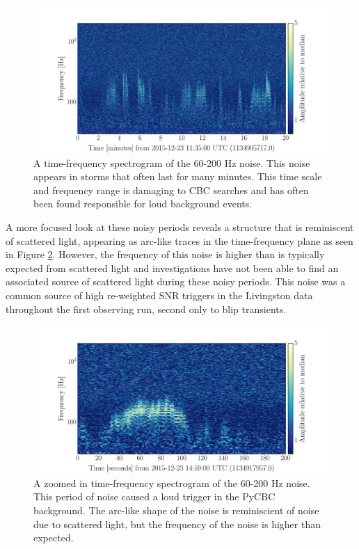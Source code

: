 \begin{figure}[!ht]%
\centering
  \includegraphics[width=\textwidth]{figures/o1-cbc-dq-paper/60-200Hz-noise-spectrogram}
  \caption[Time-frequency plot of 60-200 Hz noise]{A time-frequency spectrogram of the 60-200 Hz noise. This noise appears in storms %
           that often last for many minutes. This time scale and frequency range is damaging %
           to CBC searches and has often been found responsible for loud background events.}
\label{fig:60-200-Hz-noise}
\end{figure}

A more focused look at these noisy periods
reveals a structure that is reminiscent of scattered light, appearing as arc-like
traces in the time-frequency plane as seen in Figure \ref{fig:zoom-60-200-Hz-noise}. However, the frequency
of this noise is higher than is typically expected from scattered light and investigations have not
been able to find an associated source of scattered light during these noisy periods.
This noise was a common source of high re-weighted SNR triggers in the Livingston
data throughout the first observing run, second only to blip transients.

\begin{figure}[!ht]%
\centering
  \includegraphics[width=\textwidth]{figures/o1-cbc-dq-paper/zoom-60-200-Hz-spectrogram}
  \caption[Zoomed in time-frequency plot of 60-200 Hz noise]{A zoomed in time-frequency spectrogram of the 60-200 Hz noise. This %
           period of noise caused a loud trigger in the PyCBC background. The %
           arc-like shape of the noise is reminiscient of noise due to scattered %
           light, but the frequency of the noise is higher than expected.}
\label{fig:zoom-60-200-Hz-noise}
\end{figure}
